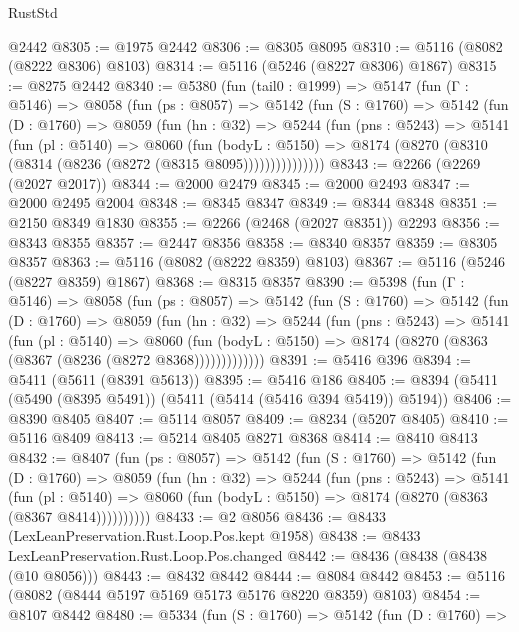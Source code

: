 \begin{lexlean}{RustStd}
\begin{coremodule}
{\begin{coremodule}
{{{{{{{{{{{{{{{{{{{{{{{{{{{{{{{    @2442
@8305 := @1975 @2442
@8306 := @8305 @8095
@8310 := @5116 (@8082 (@8222 @8306) @8103)
@8314 := @5116 (@5246 (@8227 @8306) @1867)
@8315 := @8275 @2442
@8340 := @5380
    (fun (tail0 : @1999) =>
    @5147
      (fun (Γ : @5146) =>
      @8058
        (fun (ps : @8057) =>
        @5142
          (fun (S : @1760) =>
          @5142
            (fun (D : @1760) =>
            @8059
              (fun (hn : @32) =>
              @5244
                (fun (pns : @5243) =>
                @5141
                  (fun (pl : @5140) =>
                  @8060
                    (fun (bodyL : @5150) =>
                    @8174 (@8270 (@8310 (@8314 (@8236 (@8272 (@8315 @8095)))))))))))))))
@8343 := @2266 (@2269 (@2027 @2017))
@8344 := @2000 @2479
@8345 := @2000 @2493
@8347 := @2000 @2495 @2004
@8348 := @8345 @8347
@8349 := @8344 @8348
@8351 := @2150 @8349 @1830
@8355 := @2266 (@2468 (@2027 @8351)) @2293
@8356 := @8343 @8355
@8357 := @2447 @8356
@8358 := @8340 @8357
@8359 := @8305 @8357
@8363 := @5116 (@8082 (@8222 @8359) @8103)
@8367 := @5116 (@5246 (@8227 @8359) @1867)
@8368 := @8315 @8357
@8390 := @5398
    (fun (Γ : @5146) =>
    @8058
      (fun (ps : @8057) =>
      @5142
        (fun (S : @1760) =>
        @5142
          (fun (D : @1760) =>
          @8059
            (fun (hn : @32) =>
            @5244
              (fun (pns : @5243) =>
              @5141
                (fun (pl : @5140) =>
                @8060
                  (fun (bodyL : @5150) =>
                  @8174 (@8270 (@8363 (@8367 (@8236 (@8272 @8368)))))))))))))
@8391 := @5416 @396
@8394 := @5411 (@5611 (@8391 @5613))
@8395 := @5416 @186
@8405 := @8394 (@5411 (@5490 (@8395 @5491)) (@5411 (@5414 (@5416 @394 @5419)) @5194))
@8406 := @8390 @8405
@8407 := @5114 @8057
@8409 := @8234 (@5207 @8405)
@8410 := @5116 @8409
@8413 := @5214 @8405 @8271 @8368
@8414 := @8410 @8413
@8432 := @8407
    (fun (ps : @8057) =>
    @5142
      (fun (S : @1760) =>
      @5142
        (fun (D : @1760) =>
        @8059
          (fun (hn : @32) =>
          @5244
            (fun (pns : @5243) =>
            @5141
              (fun (pl : @5140) =>
              @8060 (fun (bodyL : @5150) => @8174 (@8270 (@8363 (@8367 @8414))))))))))
@8433 := @2 @8056
@8436 := @8433 (LexLeanPreservation.Rust.Loop.Pos.kept @1958)
@8438 := @8433 LexLeanPreservation.Rust.Loop.Pos.changed
@8442 := @8436 (@8438 (@8438 (@10 @8056)))
@8443 := @8432 @8442
@8444 := @8084 @8442
@8453 := @5116 (@8082 (@8444 @5197 @5169 @5173 @5176 @8220 @8359) @8103)
@8454 := @8107 @8442
@8480 := @5334
    (fun (S : @1760) =>
    @5142
      (fun (D : @1760) =>
}}}}}}}}}}}}}}}}}}}}}}}}}}}}}}}
\end{coremodule}}
\end{coremodule}
\end{lexlean}

